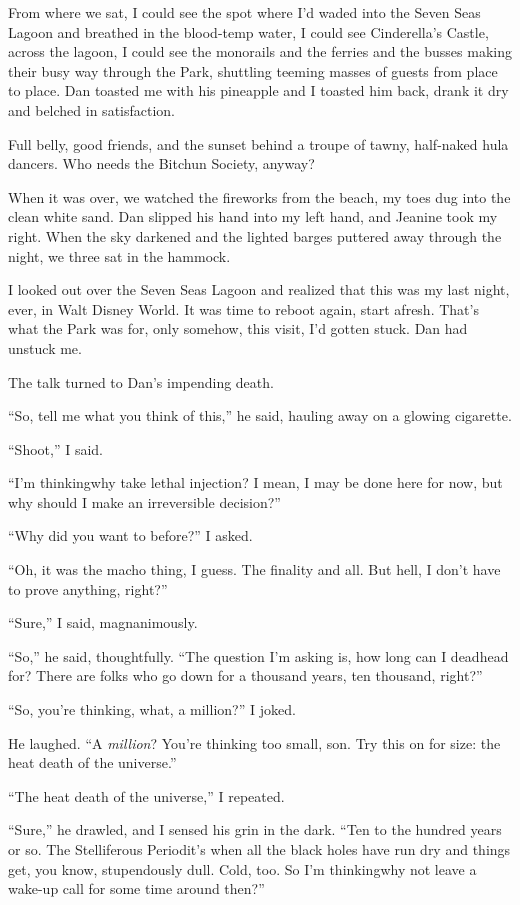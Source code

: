 From where we sat, I could see the spot where I'd waded into the
Seven Seas Lagoon and breathed in the blood-temp water, I could see
Cinderella's Castle, across the lagoon, I could see the monorails
and the ferries and the busses making their busy way through the
Park, shuttling teeming masses of guests from place to place. Dan
toasted me with his pineapple and I toasted him back, drank it dry
and belched in satisfaction.

Full belly, good friends, and the sunset behind a troupe of tawny,
half-naked hula dancers. Who needs the Bitchun Society, anyway?

When it was over, we watched the fireworks from the beach, my toes
dug into the clean white sand. Dan slipped his hand into my left
hand, and Jeanine took my right. When the sky darkened and the
lighted barges puttered away through the night, we three sat in the
hammock.

I looked out over the Seven Seas Lagoon and realized that this was
my last night, ever, in Walt Disney World. It was time to reboot
again, start afresh. That's what the Park was for, only somehow,
this visit, I'd gotten stuck. Dan had unstuck me.

The talk turned to Dan's impending death.

“So, tell me what you think of this,” he said, hauling away on a
glowing cigarette.

“Shoot,” I said.

“I'm thinking{\dash}why take lethal injection? I mean, I may be done here
for now, but why should I make an irreversible decision?”

“Why did you want to before?” I asked.

“Oh, it was the macho thing, I guess. The finality and all. But
hell, I don't have to prove anything, right?”

“Sure,” I said, magnanimously.

“So,” he said, thoughtfully. “The question I'm asking is, how long
can I deadhead for? There are folks who go down for a thousand
years, ten thousand, right?”

“So, you're thinking, what, a million?” I joked.

He laughed. “A \emph{million}? You're thinking too small, son. Try
this on for size: the heat death of the universe.”

“The heat death of the universe,” I repeated.

“Sure,” he drawled, and I sensed his grin in the dark. “Ten to the
hundred years or so. The Stelliferous Period{\dash}it's when all the
black holes have run dry and things get, you know, stupendously
dull. Cold, too. So I'm thinking{\dash}why not leave a wake-up call for
some time around then?”

